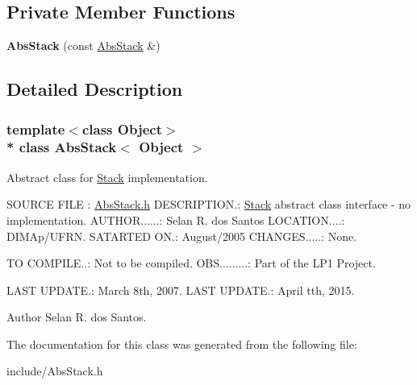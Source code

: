 \subsection*{Private Member Functions}
\begin{DoxyCompactItemize}
\item 
{\bfseries Abs\+Stack} (const \hyperlink{classAbsStack}{Abs\+Stack} \&)\hypertarget{classAbsStack_a325df7f03f0dca13168400acc29d7690}{}\label{classAbsStack_a325df7f03f0dca13168400acc29d7690}

\end{DoxyCompactItemize}


\subsection{Detailed Description}
\subsubsection*{template$<$class Object$>$\\*
class Abs\+Stack$<$ Object $>$}

Abstract class for \hyperlink{classStack}{Stack} implementation. 


\begin{DoxyPre}
SOURCE FILE : \hyperlink{AbsStack_8h_source}{AbsStack.h}
DESCRIPTION.: \hyperlink{classStack}{Stack} abstract class interface - no implementation.
AUTHOR......: Selan R. dos Santos
LOCATION....: DIMAp/UFRN.
SATARTED ON.: August/2005
CHANGES.....: None.\end{DoxyPre}



\begin{DoxyPre}TO COMPILE..: Not to be compiled.
OBS.........: Part of the LP1 Project.\end{DoxyPre}



\begin{DoxyPre}LAST UPDATE.: March 8th, 2007.
LAST UPDATE.: April tth, 2015.
\end{DoxyPre}
 \begin{DoxyAuthor}{Author}
Selan R. dos Santos. 
\end{DoxyAuthor}


The documentation for this class was generated from the following file\+:\begin{DoxyCompactItemize}
\item 
include/Abs\+Stack.\+h\end{DoxyCompactItemize}
